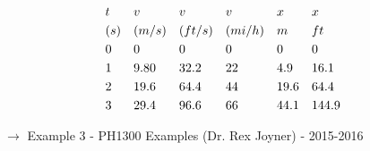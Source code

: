 	\begin{align}
		&t& &v& &v& &v& &x& &x& \notag \\
		&(s)& &(m/s)& &(ft/s)& &(mi/h)& &m& &ft& \notag \\
		&0& &0& &0& &0& &0& &0& \notag \\
		&1& &9.80& &32.2& &22& &4.9& &16.1& \notag \\
		&2& &19.6& &64.4& &44& &19.6& &64.4& \notag \\
		&3& &29.4& &96.6& &66& &44.1& &144.9& \notag
	\end{align}

	$\to$ Example 3 - PH1300 Examples (Dr. Rex Joyner) - 2015-2016
